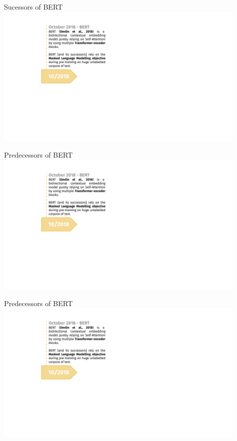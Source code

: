 \begin{frame}{Sucessors of BERT}
\hbox{\hspace{-0.5em} \includegraphics[width=12cm,page=1]{figure/transfer_learning_timeline3_nlp.pdf}}
\end{frame}
\begin{frame}[noframenumbering]{Predecessors of BERT}
\hbox{\hspace{-0.5em} \includegraphics[width=12cm,page=2]{figure/transfer_learning_timeline3_nlp.pdf}}
\end{frame}
\begin{frame}[noframenumbering]{Predecessors of BERT}
\hbox{\hspace{-0.5em} \includegraphics[width=12cm,page=3]{figure/transfer_learning_timeline3_nlp.pdf}}
\end{frame}

